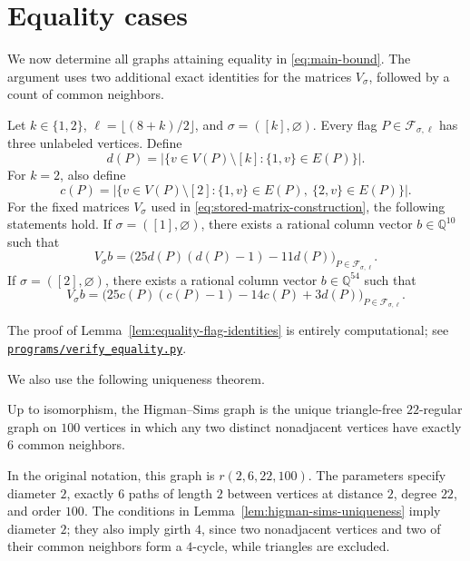 \section{Equality cases}
\label{sec:equality-cases}

We now determine all graphs attaining equality in \eqref{eq:main-bound}.
The argument uses two additional exact identities for the matrices
$V_\sigma$, followed by a count of common neighbors.

\begin{lemma}\label{lem:equality-flag-identities}
Let $k\in\{1,2\}$, $\ell=\lfloor(8+k)/2\rfloor$, and $\sigma=([k],\varnothing)$.
Every flag $P\in\mathcal F_{\sigma,\ell}$ has three unlabeled vertices.
Define
\[
d(P)=\big|\{v\in V(P)\setminus[k]:\{1,v\}\in E(P)\}\big|.
\]
For $k=2$, also define
\[
c(P)=\big|\{v\in V(P)\setminus[2]:
\{1,v\}\in E(P),\ \{2,v\}\in E(P)\}\big|.
\]
For the fixed matrices $V_\sigma$ used in
\eqref{eq:stored-matrix-construction}, the following statements hold.
If $\sigma=([1],\varnothing)$, there exists a rational column vector
$b\in\mathbb Q^{10}$ such that
\begin{equation}\label{eq:equality-one-root-vector}
V_\sigma b
=\big(25d(P)(d(P)-1)-11d(P)\big)_{P\in\mathcal F_{\sigma,\ell}}.
\end{equation}
If $\sigma=([2],\varnothing)$, there exists a rational column vector
$b\in\mathbb Q^{54}$ such that
\begin{equation}\label{eq:equality-two-root-vector}
V_\sigma b
=\big(25c(P)(c(P)-1)-14c(P)+3d(P)\big)_{P\in\mathcal F_{\sigma,\ell}}.
\end{equation}
\end{lemma}
The proof of Lemma~\ref{lem:equality-flag-identities} is entirely computational;
see \href{https://github.com/Diudiutse/triangle-free-signless-laplacian/blob/main/programs/verify_equality.py}{\texttt{programs/verify\_equality.py}}.

We also use the following uniqueness theorem.
\begin{lemma}
\label{lem:higman-sims-uniqueness}
Up to isomorphism, the Higman--Sims graph is the unique triangle-free
$22$-regular graph on $100$ vertices in which any two distinct
nonadjacent vertices have exactly $6$ common neighbors.
\end{lemma}
In the original notation, this graph is $r(2,6,22,100)$.
The parameters specify diameter $2$, exactly $6$ paths of length $2$
between vertices at distance $2$, degree $22$, and order $100$.
The conditions in Lemma~\ref{lem:higman-sims-uniqueness} imply diameter
$2$; they also imply girth $4$, since two nonadjacent vertices and two
of their common neighbors form a $4$-cycle, while triangles are excluded.


